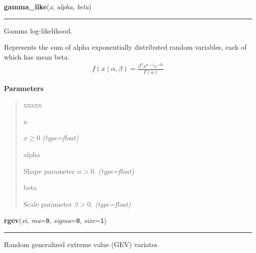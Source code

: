     \begin{boxedminipage}{\textwidth}

    \raggedright \textbf{gamma\_like}(\textit{x}, \textit{alpha}, \textit{beta})

    \vspace{-1.5ex}

    \rule{\textwidth}{0.5\fboxrule}

Gamma log-likelihood.

Represents the sum of alpha exponentially distributed random variables, each
of which has mean beta.
\begin{equation*}\begin{split}f(x \mid \alpha, \beta) = \frac{\beta^{\alpha}x^{\alpha-1}e^{-\beta x}}{\Gamma(\alpha)}\end{split}\end{equation*}    \vspace{1ex}

      \textbf{Parameters}
      \begin{quote}
        \begin{Ventry}{xxxxx}

          \item[x]


$x \ge 0$
            \textit{(type=float)}

          \item[alpha]


Shape parameter $\alpha > 0$.
            \textit{(type=float)}

          \item[beta]


Scale parameter $\beta > 0$.
            \textit{(type=float)}

        \end{Ventry}

      \end{quote}

    \vspace{1ex}

    \end{boxedminipage}

    \label{pymc:distributions:rgev}

    \vspace{0.5ex}

    \begin{boxedminipage}{\textwidth}

    \raggedright \textbf{rgev}(\textit{xi}, \textit{mu}=\texttt{0}, \textit{sigma}=\texttt{0}, \textit{size}=\texttt{1})

    \vspace{-1.5ex}

    \rule{\textwidth}{0.5\fboxrule}

Random generalized extreme value (GEV) variates.
    \vspace{1ex}

    \end{boxedminipage}

